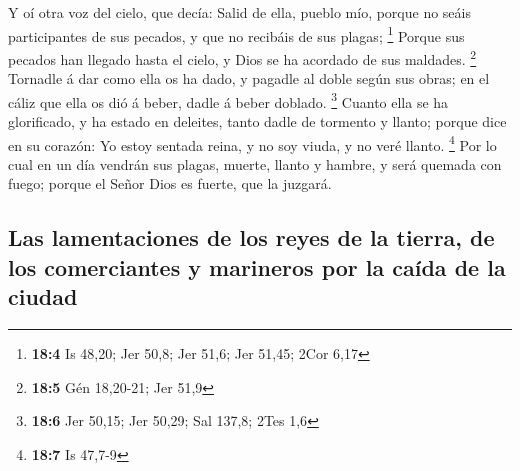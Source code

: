  Y oí otra voz del cielo, que decía: Salid de ella, pueblo
mío, porque no seáis participantes de sus pecados, y que no recibáis de
sus plagas; \footnote{\textbf{18:4} Is 48,20; Jer 50,8; Jer 51,6; Jer
  51,45; 2Cor 6,17}  Porque sus pecados han llegado hasta el
cielo, y Dios se ha acordado de sus maldades. \footnote{\textbf{18:5}
  Gén 18,20-21; Jer 51,9}  Tornadle á dar como ella os ha
dado, y pagadle al doble según sus obras; en el cáliz que ella os dió á
beber, dadle á beber doblado. \footnote{\textbf{18:6} Jer 50,15; Jer
  50,29; Sal 137,8; 2Tes 1,6}  Cuanto ella se ha
glorificado, y ha estado en deleites, tanto dadle de tormento y llanto;
porque dice en su corazón: Yo estoy sentada reina, y no soy viuda, y no
veré llanto. \footnote{\textbf{18:7} Is 47,7-9}  Por lo cual
en un día vendrán sus plagas, muerte, llanto y hambre, y será quemada
con fuego; porque el Señor Dios es fuerte, que la juzgará.

\hypertarget{las-lamentaciones-de-los-reyes-de-la-tierra-de-los-comerciantes-y-marineros-por-la-cauxedda-de-la-ciudad}{%
\subsection{Las lamentaciones de los reyes de la tierra, de los
comerciantes y marineros por la caída de la
ciudad}\label{las-lamentaciones-de-los-reyes-de-la-tierra-de-los-comerciantes-y-marineros-por-la-cauxedda-de-la-ciudad}}

